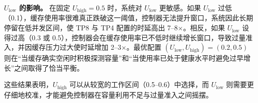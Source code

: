 \textbf{$U_{\text{low}}$ 的影响。}
在固定 $U_{\text{high}} = 0.5$ 时，系统对 $U_{\text{low}}$ 更敏感。如果 $U_{\text{low}}$ 过低（0.1），缓存使用率很难真正跌破这一阈值，控制器无法提升窗口，系统因此长期停留在低并发区间，使 TP8 与 TP4 配置的时延高出 7--8$\times$。相反，如果 $U_{\text{low}}$ 设得过高（0.3 或 0.5），控制器会在缓存使用率已不低时继续增长窗口，导致过量准入，并因缓存压力过大使时延增加 2--3$\times$。最优配置 $(U_{\text{low}}, U_{\text{high}}) = (0.2, 0.5)$ 则在“当缓存确实空闲时积极探测容量”和“当使用率已处于健康水平时避免过早增长”之间取得了恰当平衡。

这些结果表明，$U_{\text{high}}$ 可以从较宽的工作区间（0.5--0.6）中选择，而 $U_{\text{low}}$ 则需要更仔细地校准，才能避免控制器在容量利用不足与过量准入之间摇摆。
